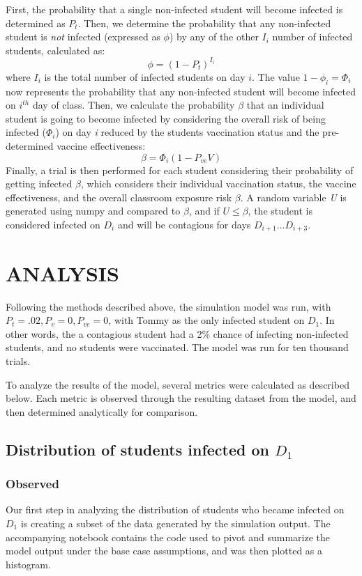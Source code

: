 \documentclass[
	letterpaper, %
]{jdf}
\begin{document}
First, the probability that a single non-infected student will become infected is determined as \(P_t\). Then, we determine the probability that any non-infected student is \textit{not} infected (expressed as \(\phi\)) by any of the other \(I_i\) number of infected students, calculated as:
\[\phi =({1-P_t})^{I_i}\]
where \(I_i\) is the total number of infected students on day \(i\). The value  \(1-\phi_i = \Phi_i\) now represents the probability that any non-infected student will become infected on \(i^{th}\) day of class. Then, we calculate the probability \(\beta\) that an individual student is going to become infected by considering the overall risk of being infected (\(\Phi_i\)) on day \textit{i} reduced by the students vaccination status and the pre-determined vaccine effectiveness:
\[\beta = \Phi_i(1-P_{ve}V)\]
Finally, a trial is then performed for each student considering their probability of getting infected \(\beta\), which considers their individual vaccination status, the vaccine effectiveness, and the overall classroom exposure risk \(\beta\). A random variable \textit{U} is generated using numpy and compared to \(\beta\), and if \(U \leq \beta\), the student is considered infected on \(D_i\) and will be contagious for days \(D_{i+1}... D_{i+3}\). \citep{harris2020array}


\section{ANALYSIS}
Following the methods described above, the simulation model was run, with \(P_{t} = .02,P_{v}=0, P_{ve}=0\), with Tommy as the only infected student on \(D_1\). In other words, the a contagious student had a 2\% chance of infecting non-infected students, and no students were vaccinated. The model was run for ten thousand trials.

To analyze the results of the model, several metrics were calculated as described below. Each metric is observed through the resulting dataset from the model, and then determined analytically for comparison. 

\subsection{Distribution of students infected on \(D_1\)}
\subsubsection{Observed}
Our first step in analyzing the distribution of students who became infected on \(D_1\) is creating a subset of the data generated by the simulation output. The accompanying notebook contains the code used to pivot and summarize the model output under the base case assumptions, and was then plotted as a histogram. 
\end{document}

